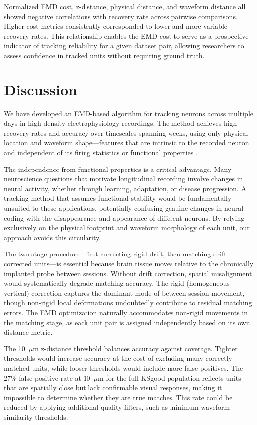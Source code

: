 \documentclass[12pt]{article}
\begin{document}
Normalized EMD cost, z-distance, physical distance, and waveform distance all showed negative correlations with recovery rate across pairwise comparisons. Higher cost metrics consistently corresponded to lower and more variable recovery rates. This relationship enables the EMD cost to serve as a prospective indicator of tracking reliability for a given dataset pair, allowing researchers to assess confidence in tracked units without requiring ground truth.

\section{Discussion}

We have developed an EMD-based algorithm for tracking neurons across multiple days in high-density electrophysiology recordings. The method achieves high recovery rates and accuracy over timescales spanning weeks, using only physical location and waveform shape---features that are intrinsic to the recorded neuron and independent of its firing statistics or functional properties \citep{williamson2016tracking, peters2021striatal}.

The independence from functional properties is a critical advantage. Many neuroscience questions that motivate longitudinal recording involve changes in neural activity, whether through learning, adaptation, or disease progression. A tracking method that assumes functional stability would be fundamentally unsuited to these applications, potentially confusing genuine changes in neural coding with the disappearance and appearance of different neurons. By relying exclusively on the physical footprint and waveform morphology of each unit, our approach avoids this circularity.

The two-stage procedure---first correcting rigid drift, then matching drift-corrected units---is essential because brain tissue moves relative to the chronically implanted probe between sessions. Without drift correction, spatial misalignment would systematically degrade matching accuracy. The rigid (homogeneous vertical) correction captures the dominant mode of between-session movement, though non-rigid local deformations undoubtedly contribute to residual matching errors. The EMD optimization naturally accommodates non-rigid movements in the matching stage, as each unit pair is assigned independently based on its own distance metric.

The 10~$\mu$m z-distance threshold balances accuracy against coverage. Tighter thresholds would increase accuracy at the cost of excluding many correctly matched units, while looser thresholds would include more false positives. The 27\% false positive rate at 10~$\mu$m for the full KSgood population reflects units that are spatially close but lack confirmable visual responses, making it impossible to determine whether they are true matches. This rate could be reduced by applying additional quality filters, such as minimum waveform similarity thresholds.
\end{document}
